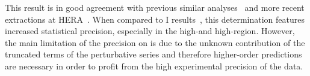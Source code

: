 This result is in good agreement with previous similar analyses~\cite{HERAIjets} and more recent extractions at HERA~\cite{britzger}. When compared to \hera I results~\cite{}, this determination features increased statistical precision, especially in the high-\etjetb and high-\qsq region. However, the main limitation of the precision on \asz is due to the unknown contribution of the truncated terms of the perturbative series and therefore higher-order predictions are necessary in order to profit from the high experimental precision of the data.
